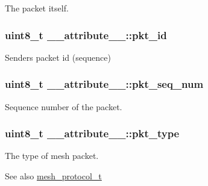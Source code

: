 The packet itself. 

\subsubsection[{\texorpdfstring{pkt\+\_\+id}{pkt_id}}]{\setlength{\rightskip}{0pt plus 5cm}uint8\+\_\+t \+\_\+\+\_\+attribute\+\_\+\+\_\+\+::pkt\+\_\+id}\hypertarget{struct____attribute_____a498bfd7c451026ed73b80a3e0a4169fc}{}\label{struct____attribute_____a498bfd7c451026ed73b80a3e0a4169fc}


Sender\textquotesingle{}s packet id (sequence) 

\subsubsection[{\texorpdfstring{pkt\+\_\+seq\+\_\+num}{pkt_seq_num}}]{\setlength{\rightskip}{0pt plus 5cm}uint8\+\_\+t \+\_\+\+\_\+attribute\+\_\+\+\_\+\+::pkt\+\_\+seq\+\_\+num}\hypertarget{struct____attribute_____acb75fb96c08ce6b43afc75f54e0d6a32}{}\label{struct____attribute_____acb75fb96c08ce6b43afc75f54e0d6a32}


Sequence number of the packet. 

\subsubsection[{\texorpdfstring{pkt\+\_\+type}{pkt_type}}]{\setlength{\rightskip}{0pt plus 5cm}uint8\+\_\+t \+\_\+\+\_\+attribute\+\_\+\+\_\+\+::pkt\+\_\+type}\hypertarget{struct____attribute_____ae19c7dcebf79b994d537fecf3cc931c9}{}\label{struct____attribute_____ae19c7dcebf79b994d537fecf3cc931c9}


The type of mesh packet. 

\begin{DoxySeeAlso}{See also}
\hyperlink{mesh__typedefs_8h_a4e50257f904223b4cb6473811f8f709f}{mesh\+\_\+protocol\+\_\+t} 
\end{DoxySeeAlso}
